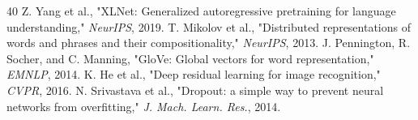\documentclass[conference]{IEEEtran}
\begin{document}
\begin{thebibliography}{40}
Z. Yang et al., "XLNet: Generalized autoregressive pretraining for language understanding," \emph{NeurIPS}, 2019.
T. Mikolov et al., "Distributed representations of words and phrases and their compositionality," \emph{NeurIPS}, 2013.
J. Pennington, R. Socher, and C. Manning, "GloVe: Global vectors for word representation," \emph{EMNLP}, 2014.
K. He et al., "Deep residual learning for image recognition," \emph{CVPR}, 2016.
N. Srivastava et al., "Dropout: a simple way to prevent neural networks from overfitting," \emph{J. Mach. Learn. Res.}, 2014.
\end{thebibliography}
\end{document}

